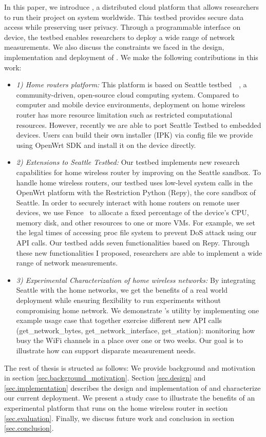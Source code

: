 In this paper, we introduce \sysname, a distributed cloud platform 
that allows researchers to run their project on system worldwide. This 
testbed provides secure data access while preserving user privacy. Through a 
programmable interface on device, the testbed enables researchers to deploy 
a wide range of network measurements. We also discuss the constraints we 
faced in the design, implementation and deployment of \sysname.
We make the following contributions in this work:
\begin{itemize}
\item\textit{1) Home routers platform:} This platform is based on Seattle testbed~\cite{zhuang2013experience}~\cite{cappos2009seattle}, a community-driven, open-source cloud computing system. Compared to computer and mobile device environments, deployment on home wireless router has more resource limitation such as restricted computational resources. However, recently we are able to port Seattle Testbed to embedded devices. Users can build their own \sysname installer (IPK) via config file we provide using OpenWrt SDK and install it on the device directly. 
\item\textit{2) Extensions to Seattle Testbed:}  Our testbed implements new research capabilities for home wireless router by improving on the Seattle sandbox. To handle home wireless routers, our testbed uses low-level system calls in the OpenWrt platform\cite{openwrt} with the Restriction Python (Repy)\cite{cappos2010retaining}, the core sandbox of Seattle. In order to securely interact with home routers on remote user devices, we use Fence~\cite{li2015fence} to allocate a fixed percentage of the device's CPU, memory disk, and other resources to one or more VMs. For example, we set the legal times of accessing proc file system to prevent DoS attack using our API calls. Our testbed adds seven functionalities based on Repy. Through these new functionalities I proposed, researchers are able to implement a wide range of network measurements.
\item\textit{3) Experimental Characterization of home wireless networks: } By integrating Seattle with the home networks, we get the benefits of a real world deployment while ensuring flexibility to run experiments without compromising home network. We demonstrate \sysname's utility by implementing one example usage case that together exercise different new API calls (get\_network\_bytes, get\_network\_interface, get\_station): monitoring how busy the WiFi channels in a place over one or two weeks. Our goal is to illustrate how \sysname can support disparate measurement needs.
\end{itemize}

The rest of thesis is structed as follows: We provide background and motivation in section \ref{sec.background_motivation}. Section \ref{sec.design} and \ref{sec.implementation} describes the design and implementation of \sysname and characterize our current deployment. We present a study case to illustrate the benefits of an experimental platform that runs on the home wireless router in section \ref{sec.evaluation}. Finally, we discuss future work and conclusion in section \ref{sec.conclusion}. 